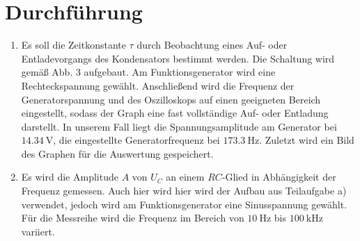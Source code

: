 \section{Durchführung}
\label{sec:Durchführung}


\renewcommand{\labelenumi}{\alph{enumi})}
\begin{enumerate}
  \item Es soll die Zeitkonstante $\tau$ durch Beobachtung eines Auf- oder Entladevorgangs
  des Kondensators bestimmt werden. Die Schaltung wird gemäß Abb. 3 aufgebaut. Am Funktionsgenerator wird eine Rechteckspannung gewählt.
  Anschließend wird die Frequenz der Generatorspannung und des Oszilloskops auf einen
  geeigneten Bereich eingestellt, sodass der Graph eine fast vollständige Auf- oder Entladung darstellt. In unserem Fall
  liegt die Spannungsamplitude am Generator bei $\SI{14.34}{\volt}$,
   die eingestellte Generatorfrequenz bei $\SI{173.3}{\hertz}$. Zuletzt wird ein Bild des Graphen für die
  Auswertung gespeichert.%

  \item Es wird die Amplitude $A$ von $U_C$ an einem $RC$-Glied in Abhängigkeit der Frequenz gemessen. Auch hier wird
  hier wird der Aufbau aus Teilaufgabe a) verwendet, jedoch wird am Funktionsgenerator eine Sinusspannung gewählt.
   Für die Messreihe wird die Frequenz im Bereich von
    $\SI{10}{\hertz}$ bis $\SI{100}{\kilo\hertz}$ variiert.%



\end{enumerate}
